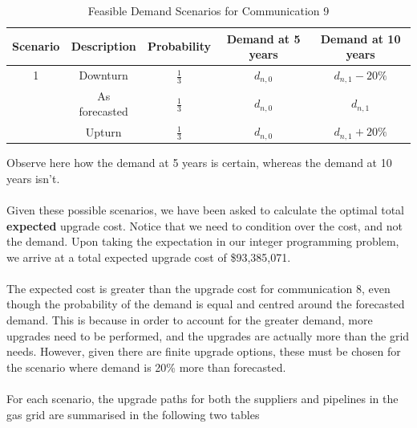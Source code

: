 \documentclass{article}
\begin{document}
\renewcommand\baselinestretch{1.5}
\begin{table}[htb]
    \centering
    \color{black}
    \begin{tabular}{|c:c:c:c:c|}
        \hline
        \textbf{Scenario} & \textbf{Description} & \textbf{Probability} & \textbf{Demand at 5 years} & \textbf{Demand at 10 years} \\
         & Downturn & \(\frac{1}{3}\) & \(d_{n,0}\) & \(d_{n,1} - 20\%\) \\  & As forecasted & \(\frac{1}{3}\) & \(d_{n,0}\) & \(d_{n,1}\) \\  & Upturn & \(\frac{1}{3}\) & \(d_{n,0}\) & \(d_{n,1} + 20\%\) \\ \hline
    \end{tabular}
    \caption{Feasible Demand Scenarios for Communication 9}
    \label{tab:comm9forecasts}
\end{table}
\renewcommand\baselinestretch{1}
\noindent
Observe here how the demand at 5 years is certain, whereas the demand at 10 years isn't.\\
\\
Given these possible scenarios, we have been asked to calculate the optimal total \textbf{expected} upgrade cost. Notice that we need to condition over the cost, and not the demand. Upon taking the expectation in our integer programming problem, we arrive at a total expected upgrade cost of \$93,385,071.\\
\\
The expected cost is greater than the upgrade cost for communication 8, even though the probability of the demand is equal and centred around the forecasted demand. This is because in order to account for the greater demand, more upgrades need to be performed, and the upgrades are actually more than the grid needs. However, given there are finite upgrade options, these must be chosen for the scenario where demand is 20\% more than forecasted.\\
\\
For each scenario, the upgrade paths for both the suppliers and pipelines in the gas grid are summarised in the following two tables
\end{document}
